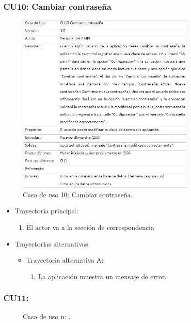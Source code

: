 		\subsubsection{CU10: Cambiar contraseña}
			\begin{figure}[htbp!]
				\centering
					\includegraphics[width=0.8\textwidth]{images/CU/CU10}
					\caption{Caso de uso 10: Cambiar contraseña.}
				\label{Tabla}
			\end{figure}
			
			\begin{itemize}
				\item Trayectoria principal:
					\begin{enumerate}
						\item El actor va a la sección de correspondencia 
					\end{enumerate}
				\item Trayectorias alternativas:
					\begin{itemize}
						\item Trayectoria alternativa A:
							\begin{enumerate}
								\item La aplicación muestra un mensaje de error.
							\end{enumerate}
					\end{itemize}
			\end{itemize}
			
	
			
		\subsubsection{CU11: }
			\begin{figure}[htbp!]
				\centering
					\caption{Caso de uso n: .}
				\label{Tabla}
			\end{figure}
			
